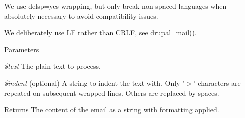 We use delsp=yes wrapping, but only break non-\/spaced languages when absolutely necessary to avoid compatibility issues.

We deliberately use LF rather than CRLF, see \hyperlink{mail_8inc_ab80781fd7273975a77cbbd13300eddbf}{drupal\_\-mail()}.


\begin{DoxyParams}{Parameters}
\item[{\em \$text}]The plain text to process. \item[{\em \$indent}](optional) A string to indent the text with. Only '$>$' characters are repeated on subsequent wrapped lines. Others are replaced by spaces.\end{DoxyParams}
\begin{DoxyReturn}{Returns}
The content of the email as a string with formatting applied. 
\end{DoxyReturn}
